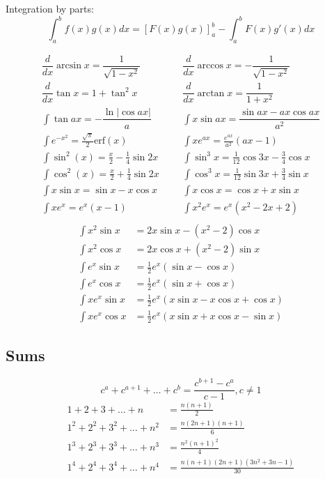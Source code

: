 Integration by parts:
\[\int_a^bf(x)g(x)dx = [F(x)g(x)]_a^b-\int_a^bF(x)g'(x)dx\]

\begin{align*}
	\dfrac{d}{dx}\arcsin x = \dfrac{1}{\sqrt{1-x^2}} &&& \dfrac{d}{dx}\arccos x = -\dfrac{1}{\sqrt{1-x^2}} \\
	\dfrac{d}{dx}\tan x = 1+\tan^2 x &&& \dfrac{d}{dx}\arctan x = \dfrac{1}{1+x^2} \\
	\int\tan ax = -\dfrac{\ln|\cos ax|}{a} &&& \int x\sin ax = \dfrac{\sin ax-ax \cos ax}{a^2} \\
	\int e^{-x^2} = \frac{\sqrt \pi}{2} \text{erf}(x) &&& \int xe^{ax} = \frac{e^{ax}}{a^2}(ax-1) \\
    \int \sin^2(x) = \frac{x}{2} - \frac{1}{4} \sin 2x &&& \int \sin^3 x = \frac{1}{12}\cos 3x - \frac{3}{4} \cos x \\
    \int \cos^2(x) = \frac{x}{2} + \frac{1}{4} \sin 2x &&& \int \cos^3 x = \frac{1}{12}\sin 3x + \frac{3}{4} \sin x \\
    \int x \sin x = \sin x - x \cos x &&& \int x \cos x = \cos x + x \sin x \\
    \int xe^x = e^x(x - 1) &&& \int x^2 e^x = e^x(x^2 - 2x + 2) \\
\end{align*}
\begin{align*}
    \int x^2 \sin x &= 2x \sin x - (x^2 - 2) \cos x \\
    \int x^2 \cos x &= 2x \cos x + (x^2 - 2) \sin x \\
    \int e^x \sin x &= \frac{1}{2}e^x (\sin x - \cos x) \\
    \int e^x \cos x &= \frac{1}{2}e^x (\sin x + \cos x) \\
    \int xe^x \sin x &= \frac{1}{2}e^x (x \sin x - x \cos x + \cos x) \\
    \int xe^x \cos x &= \frac{1}{2}e^x (x \sin x + x \cos x - \sin x)
\end{align*}

\subsection{Sums}
\[ c^a + c^{a+1} + \dots + c^{b} = \frac{c^{b+1} - c^a}{c-1}, c \neq 1 \]
\begin{align*}
	1 + 2 + 3 + \dots + n &= \frac{n(n+1)}{2} \\
	1^2 + 2^2 + 3^2 + \dots + n^2 &= \frac{n(2n+1)(n+1)}{6} \\
	1^3 + 2^3 + 3^3 + \dots + n^3 &= \frac{n^2(n+1)^2}{4} \\
	1^4 + 2^4 + 3^4 + \dots + n^4 &= \frac{n(n+1)(2n+1)(3n^2 + 3n - 1)}{30} \\
\end{align*}

